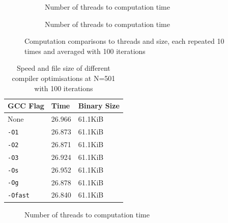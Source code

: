 \documentclass[12pt]{article}
\begin{document}
\begin{figure}[H]
    
\end{figure}

\begin{figure}
    \centering
    \begin{subfigure}[b]{0.48\textwidth}
        \begin{adjustbox}{width=\textwidth}
        
        \end{adjustbox}
        \caption{Number of threads to computation time}
        \label{fig:st}
    \end{subfigure}
    \begin{subfigure}[b]{0.48\textwidth}
        \begin{adjustbox}{width=\textwidth}
        
        \end{adjustbox}
        \caption{Number of threads to computation time}
        \label{fig:tt}
    \end{subfigure}
    \caption{Computation comparisons to threads and size, each repeated 10 times and averaged with 100 iterations}
\end{figure}


\begin{table}
    \centering
    \caption{Speed and file size of different compiler optimisations at N=501 with 100 iterations}
    \label{table:opt}
    \begin{tabular}{ | m{4cm} | m{3cm} | m{3cm} | }
        \hline
        \textbf{GCC Flag} & \textbf{Time} & \textbf{Binary Size}\\
        \hline
        None & 26.966 & 61.1KiB\\
        \hline
        \texttt{-O1} & 26.873 & 61.1KiB\\
        \hline
        \texttt{-O2} & 26.871 & 61.1KiB\\
        \hline
        \texttt{-O3} & 26.924 & 61.1KiB\\
        \hline
        \texttt{-Os} & 26.952 & 61.1KiB\\
        \hline
        \texttt{-Og} & 26.878 & 61.1KiB\\
        \hline
        \texttt{-Ofast} & 26.840 & 61.1KiB\\
        \hline
    \end{tabular}
\end{table}

\begin{figure}[H]
    \centering
    
    \caption{Number of threads to computation time}
\end{figure}
\end{document}
